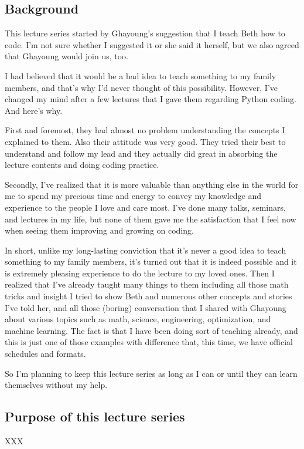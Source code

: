 \documentclass{article}
\begin{document}
\subsection{Background}

This lecture series started by Ghayoung's suggestion that I teach Beth how to code.
I'm not sure whether I suggested it or she said it herself, 
but we also agreed that Ghayoung would join us, too.

I had believed that it would be a bad idea to teach something to my family members,
and that's why I'd never thought of this possibility.
However, I've changed my mind after a few lectures that I gave them regarding Python coding.
And here's why.

First and foremost, they had almost no problem understanding the concepts I explained to them.
Also their attitude was very good. They tried their best to understand and follow my lead
and they actually did great in absorbing the lecture contents and doing coding practice.

Secondly, I've realized that it is more valuable than anything else in the world for me to
spend my precious time and energy to convey my knowledge and experience to the people I love and care most.
I've done many talks, seminars, and lectures in my life, but none of them gave me the satisfaction
that I feel now when seeing them improving and growing on coding.

In short, unlike my long-lasting conviction that it's never a good idea to teach something to my family members,
it's turned out that it is indeed possible and it is extremely pleasing experience to do the lecture to my loved ones.
Then I realized that I've already taught many things to them including
all those math tricks and insight I tried to show Beth and numerous other concepts and stories I've told her, 
and all those (boring) conversation that I shared with Ghayoung about various topics
such as math, science, engineering, optimization, and machine learning.
The fact is that I have been doing sort of teaching already, and this is just one of those examples
with difference that, this time, we have official schedules and formats.

So I'm planning to keep this lecture series as long as I can or until they can learn themselves without my help.


\subsection{Purpose of this lecture series}

XXX




\newpage
{}

\end{document}
